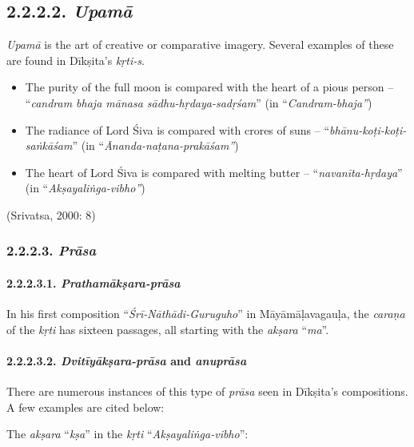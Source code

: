 \subsection*{2.2.2.2. \textit{Upamā}}

\textit{Upamā} is the art of creative or comparative imagery. Several examples of these are found in Dīkṣita’s \textit{kṛti-s}.

\begin{itemize}
\itemsep=0pt
\item The purity of the full moon is compared with the heart of a pious person – “\textit{candram bhaja mānasa sādhu-hṛdaya-sadṛśam}” (in “\textit{Candram-bhaja”})

 \item The radiance of Lord Śiva is compared with crores of suns – “\textit{bhānu-koṭi-koṭi-saṅkāśam}” (in “\textit{Ānanda-naṭana-prakāśam”})

 \item The heart of Lord Śiva is compared with melting butter – “\textit{navanīta-hṛdaya}” (in “\textit{Akṣayaliṅga-vibho”})

\end{itemize}

\begin{flushright}
(Srivatsa, 2000: 8)
\end{flushright}


\subsubsection*{2.2.2.3. \textit{Prāsa}}

\paragraph*{2.2.2.3.1. \textit{Prathamākṣara-prāsa}}

In his first composition “\textit{Śrī-Nāthādi-Guruguho}” in Māyāmāḷavagauḷa, the \textit{caraṇa} of the \textit{kṛti} has sixteen passages, all starting with the \textit{akṣara} “\textit{ma}”.


\paragraph*{2.2.2.3.2. \textit{Dvitīyākṣara-prāsa} and \textit{anuprāsa}}

There are numerous instances of this type of \textit{prāsa} seen in Dīkṣita’s compositions. A few examples are cited below:

The \textit{akṣara} “\textit{kṣa}” in the \textit{kṛti} “\textit{Akṣayaliṅga-vibho}”:

